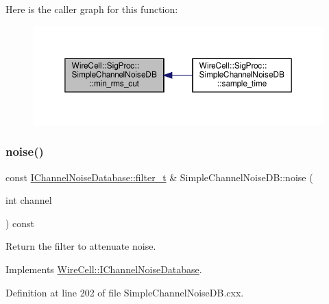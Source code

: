 Here is the caller graph for this function\+:
\nopagebreak
\begin{figure}[H]
\begin{center}
\leavevmode
\includegraphics[width=350pt]{class_wire_cell_1_1_sig_proc_1_1_simple_channel_noise_d_b_a8e8aa023834a47f96b0bdb69bc76e7a8_icgraph}
\end{center}
\end{figure}
\mbox{\label{class_wire_cell_1_1_sig_proc_1_1_simple_channel_noise_d_b_ab0b17e111bc6617ac4702610b262ed2f}} 
\subsubsection{\texorpdfstring{noise()}{noise()}}
{\footnotesize\ttfamily const \hyperlink{class_wire_cell_1_1_i_channel_noise_database_a0acbae29743542eb1c652f7a56e692f5}{I\+Channel\+Noise\+Database\+::filter\+\_\+t} \& Simple\+Channel\+Noise\+D\+B\+::noise (\begin{DoxyParamCaption}\item[{int}]{channel }\end{DoxyParamCaption}) const\hspace{0.3cm}{\ttfamily [virtual]}}



Return the filter to attenuate noise. 



Implements \hyperlink{class_wire_cell_1_1_i_channel_noise_database_a1197551d9dcfd6dc8f656a8aecd5b962}{Wire\+Cell\+::\+I\+Channel\+Noise\+Database}.



Definition at line 202 of file Simple\+Channel\+Noise\+D\+B.\+cxx.

